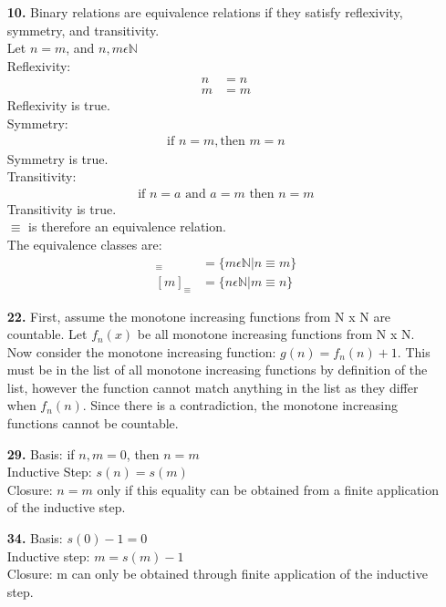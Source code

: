 \documentclass[]{article}
\begin{document}
\begin{flushleft}
\begin{enumerate}
\item [\textbf{10.}] Binary relations are equivalence relations if they satisfy reflexivity, symmetry, and transitivity.\\
\bigskip
Let $n=m$, and $n,m\epsilon \mathbb{N}$\\
\bigskip
Reflexivity:
\begin{align*}
n&=n\\
m&=m
\end{align*}
Reflexivity is true.\\
Symmetry:
\begin{align*}
\text{if } n=m, \text{then }m=n
\end{align*}
Symmetry is true.\\
Transitivity:
\begin{align*}
\text{if } n=a \text{ and } a=m \text{ then } n=m
\end{align*}
Transitivity is true.\\
$\equiv$ is therefore an equivalence relation.\\
The equivalence classes are:
\begin{align*}
	[n]_{\equiv}  &= \{m\epsilon\mathbb{N}|n\equiv m\}\\
	[m]_{\equiv}  &= \{n\epsilon\mathbb{N}|m\equiv n\}
\end{align*}

\item [\textbf{22.}] First, assume the monotone increasing functions from N x N are countable. Let $f_{n}(x)$ be all monotone increasing functions from N x N. \\
\medskip
Now consider the monotone increasing function: $g(n) = f_n(n)+1$. This must be in the list of all monotone increasing functions by definition of the list, however the function cannot match anything in the list as they differ when $f_n(n)$. Since there is a contradiction, the monotone increasing functions cannot be countable.

\item[\textbf{29.}]Basis: if $n,m=0$, then $n=m$\\
Inductive Step: $s(n) = s(m)$\\
Closure: $n=m$ only if this equality can be obtained from a finite application of the inductive step.\\

\item[\textbf{34.}] Basis: $s(0) - 1 = 0$\\
Inductive step: $m = s(m) -1$\\
Closure: m can only be obtained through finite application of the inductive step.\\
\newpage


\end{enumerate}
\end{flushleft}
\end{document}
